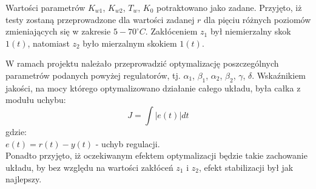 Wartości parametrów $K_{w1}$, $K_{w2}$, $T_w$, $K_0$ potraktowano jako zadane. Przyjęto, iż testy zostaną przeprowadzone dla wartości zadanej $r$ dla pięciu różnych poziomów zmieniających się w zakresie $5-70^{\circ} C$. Zakłóceniem $z_1$ był niemierzalny skok $1(t)$, natomiast $z_2$ było mierzalnym skokiem $1(t)$.

W ramach projektu należało przeprowadzić optymalizację poszczególnych parametrów podanych powyżej regulatorów, tj. $\alpha_1$, $\beta_1$, $\alpha_2$, $\beta_2$, $\gamma$, $\delta$. Wskaźnikiem jakości, na mocy którego optymalizowano działanie całego układu, była całka z modułu uchybu:
\begin{equation}\label{wsk_jak}
J = \int |e(t)| dt
\end{equation}
gdzie: \\
$e(t) = r(t) - y(t)$ - uchyb regulacji.\\ 

 Ponadto przyjęto, iż oczekiwanym efektem optymalizacji będzie takie zachowanie układu, by bez względu na wartości zakłóceń $z_1$ i $z_2$, efekt stabilizacji był jak najlepszy.

